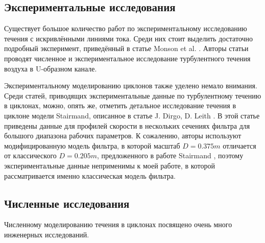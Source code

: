   
	\subsection{Экспериментальные исследования}
		\hspace{1em}Существует большое количество работ по экспериментальному исследованию течения с искривлёнными линиями тока. Среди них стоит выделить достаточно подробный эксперимент, приведённый в статье Monson et al. \cite{Monson}. Авторы статьи проводят численное и экспериментальное исследование турбулентного течения воздуха в U-образном канале.
		
		Экспериментальному моделированию циклонов также уделено немало внимания. Среди статей, приводящих экспериментальные данные по турбулентному течению в циклонах, можно, опять же, отметить детальное исследование течения в циклоне модели Stairmand, описанное в статье J. Dirgo, D. Leith \cite{DirgoLeith}. В этой статье приведены данные для профилей скорости в нескольких сечениях фильтра для большого диапазона рабочих параметров. К сожалению, авторы используют модифицированную модель фильтра, в которой масштаб $D = 0.375m$ отличается от классического $D = 0.205m$, предложенного в работе Stairmand \cite{Stairmand}, поэтому экспериментальные данные неприменимы к моей работе, в которой рассматривается именно классическая модель фильтра.
	\subsection{Численные исследования}
		\hspace{2em}Численному моделированию течения в циклонах посвящено очень много инженерных исследований.
\newpage
